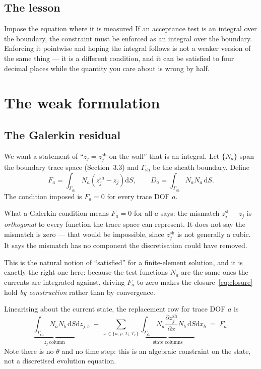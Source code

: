 \documentclass[11pt,a4paper]{article}
\newcommand{\zj}{z_j}
\newcommand{\zjsh}{z^{\mathrm{sh}}_{j}}
\newcommand{\dd}{\mathrm{d}}
\newcommand{\Gam}{\Gamma_{\!\mathrm{sh}}}
\begin{document}
\subsection{The lesson}

\begin{concept}{Impose the equation where it is measured}
If an acceptance test is an integral over the boundary, the constraint must be enforced as an
integral over the boundary. Enforcing it pointwise and hoping the integral follows is not a weaker
version of the same thing --- it is a different condition, and it can be satisfied to four decimal
places while the quantity you care about is wrong by half.
\end{concept}

\section{The weak formulation}

\subsection{The Galerkin residual}

We want a statement of ``$\zj=\zjsh$ on the wall'' that is an integral. Let $\{N_a\}$ span the
boundary trace space (Section~3.3) and $\Gam$ be the sheath boundary. Define
\begin{equation}
  F_a = \int_{\Gam} N_a \left(\zjsh - \zj\right) \dd S,
  \qquad
  D_a = \int_{\Gam} N_a N_a \,\dd S .
  \label{eq:FaDa}
\end{equation}
The condition imposed is $F_a=0$ for every trace DOF $a$.

\begin{concept}{What a Galerkin condition means}
$F_a=0$ for all $a$ says: the mismatch $\zjsh-\zj$ is \emph{orthogonal} to every function the trace
space can represent. It does not say the mismatch is zero --- that would be impossible, since $\zjsh$
is not generally a cubic. It says the mismatch has no component the discretisation could have removed.

This is the natural notion of ``satisfied'' for a finite-element solution, and it is exactly the
right one here: because the test functions $N_a$ are the same ones the currents are integrated
against, driving $F_a$ to zero makes the closure~\eqref{eq:closure} hold \emph{by construction}
rather than by convergence.
\end{concept}

Linearising about the current state, the replacement row for trace DOF $a$ is
\begin{equation}
  \underbrace{\int_{\Gam} N_a N_b \,\dd S}_{\zj\ \text{column}} \dd z_{j,b}
  \;-\;
  \sum_{x \in \{u,\rho,T_i,T_e\}}
  \underbrace{\int_{\Gam} N_a \frac{\partial \zjsh}{\partial x} N_b \,\dd S}_{\text{state columns}} \dd x_b
  \;=\; F_a .
  \label{eq:row}
\end{equation}
Note there is no $\theta$ and no time step: this is an algebraic constraint on the state, not a
discretised evolution equation.
\end{document}
